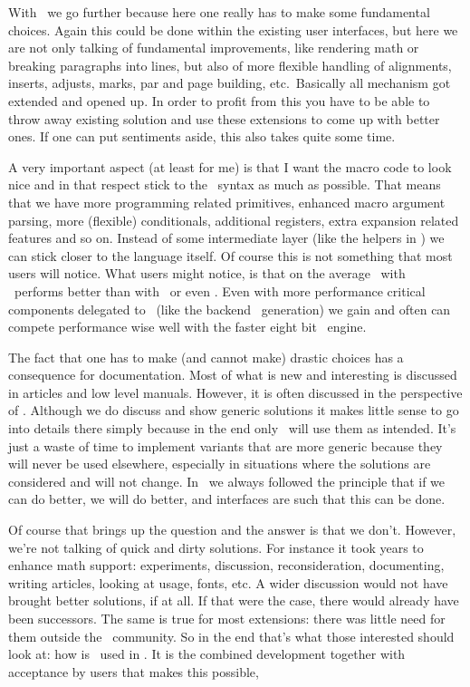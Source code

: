 With \LUAMETATEX\ we go further because here one really has to make some
fundamental choices. Again this could be done within the existing user
interfaces, but here we are not only talking of fundamental improvements, like
rendering math or breaking paragraphs into lines, but also of more flexible
handling of alignments, inserts, adjusts, marks, par and page building, etc.\
Basically all mechanism got extended and opened up. In order to profit from this
you have to be able to throw away existing solution and use these extensions to
come up with better ones. If one can put sentiments aside, this also takes quite
some time.

A very important aspect (at least for me) is that I want the macro code to look
nice and in that respect stick to the \TEX\ syntax as much as possible. That
means that we have more programming related primitives, enhanced macro argument
parsing, more (flexible) conditionals, additional registers, extra expansion
related features and so on. Instead of some intermediate layer (like the helpers
in \CONTEXT) we can stick closer to the language itself. Of course this is not
something that most users will notice. What users might notice, is that on the
average \CONTEXT\ with \LUAMETATEX\ performs better than with \LUATEX\ or even
\LUAMETATEX. Even with more performance critical components delegated to \LUA\
(like the backend \PDF\ generation) we gain and often can compete performance
wise well with the faster eight bit \PDFTEX\ engine.

The fact that one has to make (and cannot make) drastic choices has a consequence
for documentation. Most of what is new and interesting is discussed in articles
and low level manuals. However, it is often discussed in the perspective of
\CONTEXT. Although we do discuss and show generic solutions it makes little sense
to go into details there simply because in the end only \CONTEXT\ will use them
as intended. It's just a waste of time to implement variants that are more
generic because they will never be used elsewhere, especially in situations where
the solutions are considered \quote {standard} and will not change. In \CONTEXT\
we always followed the principle that if we can do better, we will do better, and
interfaces are such that this can be done.

Of course that brings up the question \quotation {How do you know that these are
the best solutions} and the answer is that we don't. However, we're not talking
of quick and dirty solutions. For instance it took years to enhance math support:
experiments, discussion, reconsideration, documenting, writing articles, looking
at usage, fonts, etc. A wider discussion would not have brought better solutions,
if at all. If that were the case, there would already have been successors. The
same is true for most extensions: there was little need for them outside the
\CONTEXT\ community. So in the end that's what those interested should look at:
how is \LUAMETATEX\ used in \CONTEXT. It is the combined development together with
acceptance by users that makes this possible,

\stopsection

\stopdocument

